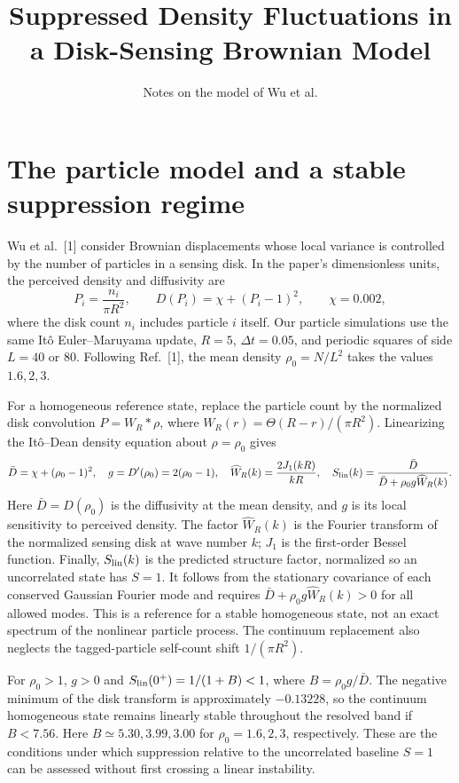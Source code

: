 \documentclass[10pt]{article}
\title{\textbf{Suppressed Density Fluctuations in a Disk-Sensing Brownian Model}}
\author{Notes on the model of Wu et al.}
\date{}
\begin{document}
\maketitle
\vspace{-2em}
\section{The particle model and a stable suppression regime}
Wu et al.\ [1] consider Brownian displacements whose local variance is controlled by the number of particles in a sensing disk. In the paper's dimensionless units, the perceived density and diffusivity are
\begin{equation}
 P_i=\frac{n_i}{\pi R^2},\qquad D(P_i)=\chi+(P_i-1)^2,
 \qquad \chi=0.002,
 \label{eq:model}
\end{equation}
where the disk count $n_i$ includes particle $i$ itself. Our particle simulations use the same It\^{o} Euler--Maruyama update, $R=5$, $\Delta t=0.05$, and periodic squares of side $L=40$ or $80$. Following Ref.\ [1], the mean density $\rho_0=N/L^2$ takes the values $1.6,2,3$.

For a homogeneous reference state, replace the particle count by the normalized disk convolution $P=W_R*\rho$, where $W_R(r)=\Theta(R-r)/(\pi R^2)$. Linearizing the It\^{o}--Dean density equation about $\rho=\rho_0$ gives
\begin{equation}
 \bar D=\chi+(\rho_0-1)^2,\quad g=D'(\rho_0)=2(\rho_0-1),\quad
 \widehat W_R(k)=\frac{2J_1(kR)}{kR},\quad
 S_{\rm lin}(k)=\frac{\bar D}{\bar D+\rho_0g\widehat W_R(k)}.
 \label{eq:linear}
\end{equation}
Here $\bar D=D(\rho_0)$ is the diffusivity at the mean density, and $g$ is its local sensitivity to perceived density. The factor $\widehat W_R(k)$ is the Fourier transform of the normalized sensing disk at wave number $k$; $J_1$ is the first-order Bessel function. Finally, $S_{\rm lin}(k)$ is the predicted structure factor, normalized so an uncorrelated state has $S=1$. It follows from the stationary covariance of each conserved Gaussian Fourier mode and requires $\bar D+\rho_0g\widehat W_R(k)>0$ for all allowed modes. This is a reference for a stable homogeneous state, not an exact spectrum of the nonlinear particle process. The continuum replacement also neglects the tagged-particle self-count shift $1/(\pi R^2)$.

For $\rho_0>1$, $g>0$ and $S_{\rm lin}(0^+)=1/(1+B)<1$, where $B=\rho_0g/\bar D$. The negative minimum of the disk transform is approximately $-0.13228$, so the continuum homogeneous state remains linearly stable throughout the resolved band if $B<7.56$. Here $B\simeq5.30,3.99,3.00$ for $\rho_0=1.6,2,3$, respectively. These are the conditions under which suppression relative to the uncorrelated baseline $S=1$ can be assessed without first crossing a linear instability.
\end{document}
